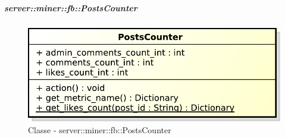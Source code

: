 	\subparagraph{server::miner::fb::PostsCounter} %
		\label{subp:server_miner_fb_PostsCounter}
		    \begin{figure}[!htbp]
 		 		\centering
 				\centerline{\includegraphics[scale=0.75]{./images/server/classes/miner/posts_counter.pdf}}
 				\caption{Classe - server::miner::fb::PostsCounter}
			\end{figure}
